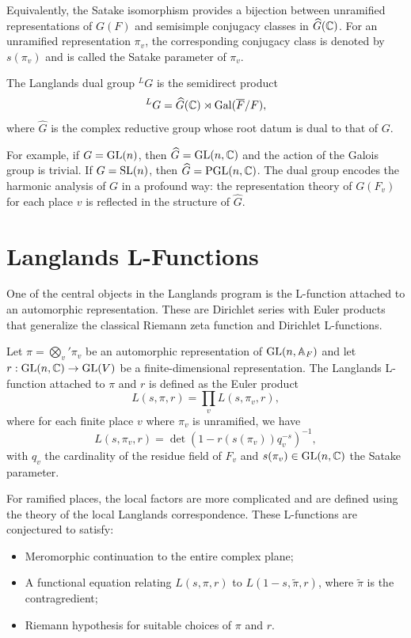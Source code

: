 Equivalently, the Satake isomorphism provides a bijection between unramified representations of \(G(F)\) and semisimple conjugacy classes in \(\widehat{G}(\mathbb{C})\). For an unramified representation \(\pi_v\), the corresponding conjugacy class is denoted by \(s(\pi_v)\) and is called the Satake parameter of \(\pi_v\).

\begin{definition}
The Langlands dual group \({}^L G\) is the semidirect product
\[
{}^L G = \widehat{G}(\mathbb{C}) \rtimes \operatorname{Gal}(\overline{F}/F),
\]
where \(\widehat{G}\) is the complex reductive group whose root datum is dual to that of \(G\).
\end{definition}

For example, if \(G = \operatorname{GL}(n)\), then \(\widehat{G} = \operatorname{GL}(n,\mathbb{C})\) and the action of the Galois group is trivial. If \(G = \operatorname{SL}(n)\), then \(\widehat{G} = \operatorname{PGL}(n,\mathbb{C})\). The dual group encodes the harmonic analysis of \(G\) in a profound way: the representation theory of \(G(F_v)\) for each place \(v\) is reflected in the structure of \(\widehat{G}\).

\section{Langlands L-Functions}

One of the central objects in the Langlands program is the L-function attached to an automorphic representation. These are Dirichlet series with Euler products that generalize the classical Riemann zeta function and Dirichlet L-functions.

\begin{definition}
Let \(\pi = \bigotimes_v' \pi_v\) be an automorphic representation of \(\operatorname{GL}(n,\mathbb{A}_F)\) and let \(r : \operatorname{GL}(n,\mathbb{C}) \to \operatorname{GL}(V)\) be a finite-dimensional representation. The Langlands L-function attached to \(\pi\) and \(r\) is defined as the Euler product
\[
L(s,\pi,r) = \prod_v L(s,\pi_v,r),
\]
where for each finite place \(v\) where \(\pi_v\) is unramified, we have
\[
L(s,\pi_v,r) = \det\left(1 - r(s(\pi_v)) q_v^{-s}\right)^{-1},
\]
with \(q_v\) the cardinality of the residue field of \(F_v\) and \(s(\pi_v) \in \operatorname{GL}(n,\mathbb{C})\) the Satake parameter.
\end{definition}

For ramified places, the local factors are more complicated and are defined using the theory of the local Langlands correspondence. These L-functions are conjectured to satisfy:
\begin{itemize}
\item Meromorphic continuation to the entire complex plane;
\item A functional equation relating \(L(s,\pi,r)\) to \(L(1-s,\widetilde{\pi},r)\), where \(\widetilde{\pi}\) is the contragredient;
\item Riemann hypothesis for suitable choices of \(\pi\) and \(r\).
\end{itemize}

